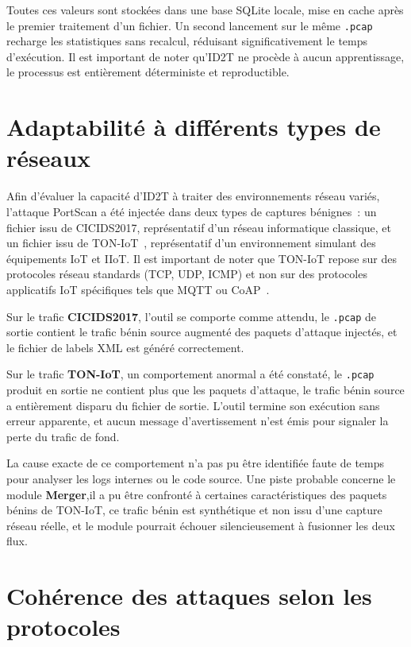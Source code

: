 \documentclass[12pt, a4paper]{report}
\begin{document}
Toutes ces valeurs sont stockées dans une base SQLite locale, mise en
cache après le premier traitement d'un fichier. Un second lancement
sur le même \texttt{.pcap} recharge les statistiques sans recalcul,
réduisant significativement le temps d'exécution.
Il est important de noter qu'ID2T ne procède à aucun apprentissage,
le processus est entièrement déterministe et reproductible.
 
 
 
 
\section{Adaptabilité à différents types de réseaux}

Afin d'évaluer la capacité d'ID2T à traiter des environnements réseau
variés, l'attaque PortScan a été injectée dans deux types de captures
bénignes~: un fichier issu de CICIDS2017, représentatif d'un réseau
informatique classique, et un fichier issu de TON-IoT~\cite{alsaedi2020},
représentatif d'un environnement simulant des équipements IoT et IIoT.
Il est important de noter que TON-IoT repose sur des protocoles réseau
standards (TCP, UDP, ICMP) et non sur des protocoles applicatifs IoT
spécifiques tels que MQTT ou CoAP~\cite{dinh2026}.

Sur le trafic \textbf{CICIDS2017}, l'outil se comporte comme attendu,
le \texttt{.pcap} de sortie contient le trafic bénin source augmenté
des paquets d'attaque injectés, et le fichier de labels XML est généré
correctement.

Sur le trafic \textbf{TON-IoT}, un comportement anormal a été constaté,
le \texttt{.pcap} produit en sortie ne contient plus que les paquets
d'attaque, le trafic bénin source a entièrement disparu du fichier
de sortie. L'outil termine son exécution sans erreur apparente, et aucun message
d'avertissement n'est émis pour signaler la perte du trafic de fond.

La cause exacte de ce comportement n'a pas pu être identifiée faute de temps pour analyser les logs internes ou
le code source. Une piste probable concerne le module \textbf{Merger},il a pu être
confronté à certaines caractéristiques des paquets bénins de TON-IoT, ce trafic bénin est synthétique et non issu d'une capture réseau réelle, et le module pourrait échouer silencieusement à fusionner les deux flux.




\section{Cohérence des attaques selon les protocoles}
\label{sec:coherence}
\end{document}
